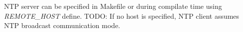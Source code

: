 NTP server can be specified in Makefile or
during compilate time using {\it{REMOTE\_HOST}} define.
TODO: If no host is specified,
NTP client assumes NTP broadcast communication mode.




